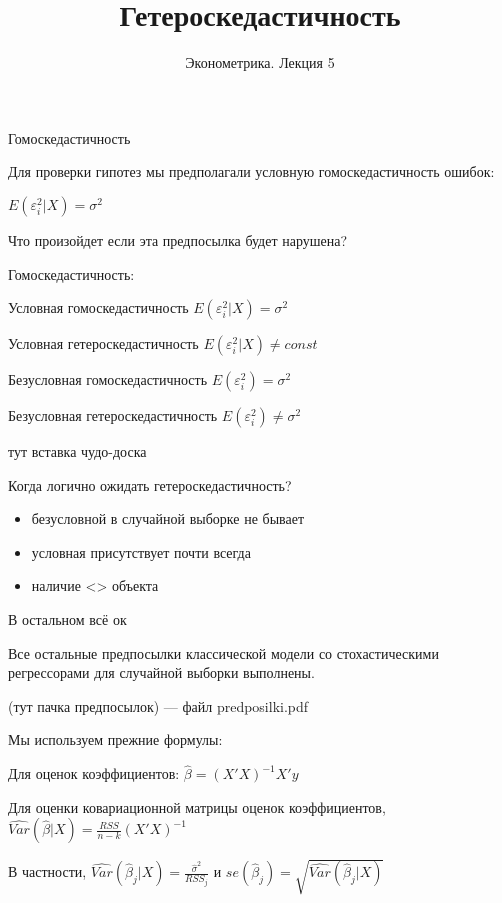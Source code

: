 \documentclass[ignorenonframetext,]{beamer}
\author[Эконометрика. Лекция 5]{Эконометрика. Лекция 5}
\title{Гетероскедастичность}
\date{}
\begin{document}
\frame{\titlepage}

\begin{frame}{Гомоскедастичность}

Для проверки гипотез мы предполагали условную гомоскедастичность ошибок:

\(E(\varepsilon_i^2 | X)=\sigma^2\)

Что произойдет если эта предпосылка будет нарушена?

\end{frame}

\begin{frame}{Гомоскедастичность:}

Условная гомоскедастичность \(E(\varepsilon_i^2 | X)=\sigma^2\)

Условная гетероскедастичность \(E(\varepsilon_i^2 | X) \neq const\)

Безусловная гомоскедастичность \(E(\varepsilon_i^2)=\sigma^2\)

Безусловная гетероскедастичность \(E(\varepsilon_i^2) \neq \sigma^2\)

тут вставка чудо-доска

\end{frame}

\begin{frame}{Когда логично ожидать гетероскедастичность?}

\begin{itemize}
\item
  безусловной в случайной выборке не бывает
\item
  условная присутствует почти всегда
\item
  наличие \textless{}\textgreater{} объекта
\end{itemize}

\end{frame}

\begin{frame}{В остальном всё ок}

Все остальные предпосылки классической модели со стохастическими
регрессорами для случайной выборки выполнены.

(тут пачка предпосылок) --- файл predposilki.pdf

\end{frame}

\begin{frame}{Мы используем прежние формулы:}

Для оценок коэффициентов: \(\hat{\beta}=(X'X)^{-1}X'y\)

Для оценки ковариационной матрицы оценок коэффициентов,
\(\widehat{Var}(\hat{\beta}|X)=\frac{RSS}{n-k}(X'X)^{-1}\)

В частности,
\(\widehat{Var}(\hat{\beta}_j|X)=\frac{\hat{\sigma}^2}{RSS_j}\) и
\(se(\hat{\beta}_j)=\sqrt{\widehat{Var}(\hat{\beta}_j|X)}\)

\end{frame}
\end{document}
